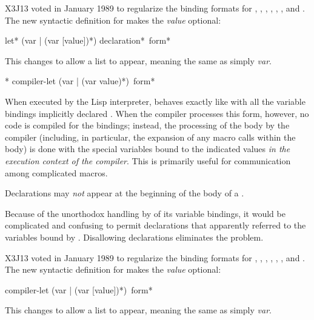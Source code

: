 \begin{defspec}
\begin{new}
X3J13 voted in January 1989
to regularize the binding formats for , , ,
, , , and .
The new syntactic definition for  makes the \textit{value} optional:

\begin{defmac}
let* ({var | (var [value])}*) {declaration}* {\,form}*

This changes  to allow a list  to appear,
meaning the same as simply \textit{var}.
\end{defmac}
\end{new}
\end{defspec}

\begin{obsolete}
\begin{defspec}*
compiler-let ({var | (var value)}*) {\,form}*

When executed by the Lisp interpreter,  behaves
exactly like  with all the variable bindings implicitly
declared .  When the compiler processes this form,
however, no code is compiled for the bindings;
instead, the processing of the body by the compiler
(including, in particular, the expansion of any macro calls
within the body) is done with
the special variables bound to the indicated values \textit{in the
execution context of the compiler}.  This is primarily useful for
communication among complicated macros.

Declarations may \textit{not} appear at the beginning of the body
of a .

\beforenoterule
\begin{rationale}
Because of the unorthodox
handling by  of its variable bindings,
it would be complicated and confusing to permit declarations
that apparently referred to the variables bound by .
Disallowing declarations eliminates the problem.
\end{rationale}
\afternoterule

X3J13 voted in January 1989
to regularize the binding formats for , , ,
, , , and .
The new syntactic definition for  makes the \textit{value} optional:

\begin{defmac}
compiler-let ({var | (var [value])}*) {\,form}*

This changes  to allow a list  to appear,
meaning the same as simply \textit{var}.
\end{defmac}
\end{defspec}
\end{obsolete}

